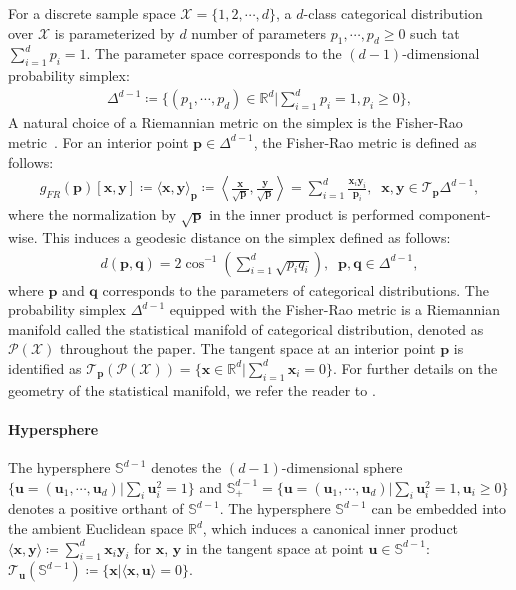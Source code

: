 For a discrete sample space $\mathcal{X}=\{1,2,\cdots,d\}$, a $d$-class categorical distribution over $\mathcal{X}$ is parameterized by $d$ number of parameters $p_1,\cdots,p_d \geq 0$ such tat $\sum^d_{i=1} p_i = 1$.
The parameter space corresponds to the $(d-1)$-dimensional probability simplex:
\begin{align}
    \Delta^{d-1} \coloneqq \{ (p_1,\cdots,p_d)\in\mathbb{R}^d | \sum^{d}_{i=1} p_i = 1, p_i\geq 0 \},
\end{align}
A natural choice of a Riemannian metric on the simplex is the Fisher-Rao metric~\citep{rao1992information,amari2016information}.
For an interior point $\bm{p}\in\Delta^{d-1}$, the Fisher-Rao metric is defined as follows:
\begin{align}
    g_{FR}(\bm{p})[\bm{x},\bm{y}] \coloneqq \langle \bm{x},\bm{y} \rangle_{\bm{p}} \coloneqq \left\langle \frac{\bm{x}}{\sqrt{\bm{p}}}, \frac{\bm{y}}{\sqrt{\bm{p}}} \right\rangle  = \sum^{d}_{i=1} \frac{\bm{x}_i \bm{y}_i}{\bm{p}_i}, \;\; \bm{x}, \bm{y} \in \mathcal{T}_{\bm{p}} \Delta^{d-1}, 
\end{align}
where the normalization by $\sqrt{\bm{p}}$ in the inner product is performed component-wise.
This induces a geodesic distance on the simplex defined as follows:
\begin{align}
    d(\bm{p}, \bm{q}) = 2 \cos^{-1}\left(\sum^d_{i=1} \sqrt{p_i q_i}\right), \;\; \bm{p}, \bm{q} \in \Delta^{d-1},
\end{align} 
where $\bm{p}$ and $\bm{q}$ corresponds to the parameters of categorical distributions.
The probability simplex $\Delta^{d-1}$ equipped with the Fisher-Rao metric is a Riemannian manifold called the statistical manifold of categorical distribution, denoted as $\mathcal{P}(\mathcal{X})$ throughout the paper.
The tangent space at an interior point $\bm{p}$ is identified as $\mathcal{T}_{\bm{p}}(\mathcal{P}(\mathcal{X})) = \{\bm{x}\in\mathbb{R}^d|\sum^d_{i=1}\bm{x}_i = 0\}$.
For further details on the geometry of the statistical manifold, we refer the reader to \citet{ay2017information}.



\paragraph{Hypersphere}

The hypersphere $\mathbb{S}^{d-1}$ denotes the $(d-1)$-dimensional sphere $\{\bm{u}=(\bm{u}_1,\cdots,\bm{u}_d)| \sum_i \bm{u}_i^2=1\}$ and $\mathbb{S}^{d-1}_{+}=\{\bm{u}=(\bm{u}_1,\cdots,\bm{u}_d)| \sum_i \bm{u}_i^2=1, \bm{u}_i\geq 0\}$ denotes a positive orthant of $\mathbb{S}^{d-1}$.
The hypersphere $\mathbb{S}^{d-1}$ can be embedded into the ambient Euclidean space $\mathbb{R}^d$, which induces a canonical inner product $\big\langle \bm{x}, \bm{y} \big\rangle \coloneqq \sum^d_{i=1} \bm{x}_i\bm{y}_i$ for $\bm{x}$, $\bm{y}$ in the tangent space at point $\bm{u}\in\mathbb{S}^{d-1}$: $\mathcal{T}_{\bm{u}}(\mathbb{S}^{d-1}) \coloneqq \{\bm{x} | \langle \bm{x}, \bm{u}\rangle=0 \}$.

